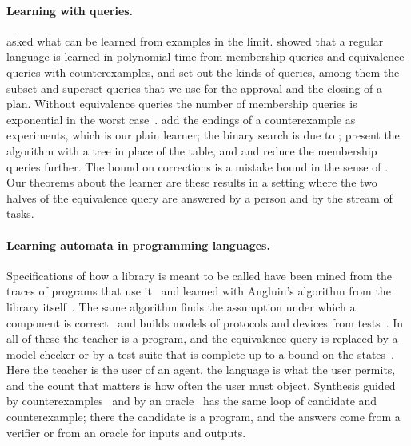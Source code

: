 \documentclass[acmsmall,nonacm,screen]{acmart}
\begin{document}
\paragraph{Learning with queries.} \citet{gold1967} asked what can be learned from examples
in the limit. \citet{angluin1987} showed that a regular language is learned in polynomial
time from membership queries and equivalence queries with counterexamples, and
\citet{angluin1988} set out the kinds of queries, among them the subset and superset queries
that we use for the approval and the closing of a plan. Without equivalence queries the
number of membership queries is exponential in the worst case~\cite{angluin1981}.
\citet{maler1995} add the endings of a counterexample as experiments, which is our plain
learner; the binary search is due to \citet{rivest1993}; \citet{kearns1994} present the
algorithm with a tree in place of the table, and \citet{isberner2014} and
\citet{vaandrager2022} reduce the membership queries further. The bound on corrections is a
mistake bound in the sense of \citet{littlestone1988}. Our theorems about the learner are
these results in a setting where the two halves of the equivalence query are answered by a
person and by the stream of tasks.

\paragraph{Learning automata in programming languages.} Specifications of how a library is
meant to be called have been mined from the traces of programs that use
it~\cite{ammons2002} and learned with Angluin's algorithm from the library
itself~\cite{alur2005}. The same algorithm finds the assumption under which a component is
correct~\cite{cobleigh2003} and builds models of protocols and devices from
tests~\cite{vaandrager2017}. In all of these the teacher is a program, and the equivalence
query is replaced by a model checker or by a test suite that is complete up to a bound on
the states~\cite{chow1978}. Here the teacher is the user of an agent, the language is what
the user permits, and the count that matters is how often the user must object. Synthesis
guided by counterexamples~\cite{solarlezama2006} and by an oracle~\cite{jha2010} has the same
loop of candidate and counterexample; there the candidate is a program, and the answers come
from a verifier or from an oracle for inputs and outputs.
\end{document}
